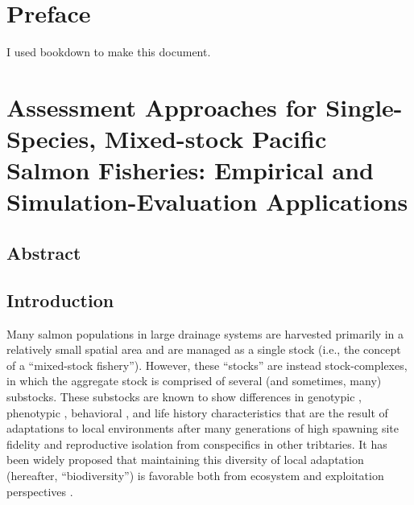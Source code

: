 \documentclass[12pt,]{book}
\theoremstyle{definition}
\theoremstyle{definition}
\theoremstyle{definition}
\theoremstyle{remark}
\begin{document}
\setlength{\parskip}{0pt plus 0pt minus 0pt}

\doublespacing

\chapter*{Preface}\label{preface}

I used bookdown \citep{xie-2015} to make this document.

\chapter{Assessment Approaches for Single-Species, Mixed-stock Pacific
Salmon Fisheries: Empirical and Simulation-Evaluation
Applications}\label{ch4}

\section*{Abstract}\label{abstract}

\newpage

\section{Introduction}\label{introduction}

\noindent
Many salmon populations in large drainage systems are harvested
primarily in a relatively small spatial area and are managed as a single
stock (i.e., the concept of a ``mixed-stock fishery''). However, these
``stocks'' are instead stock-complexes, in which the aggregate stock is
comprised of several (and sometimes, many) substocks. These substocks
are known to show differences in genotypic \citep{templin-etal-2004},
phenotypic \citep[e.g., morphology;][]{hendry-quinn-1997}, behavioral
\citep[e.g., run timing;][]{clark-etal-2015, smith-liller-2017}, and
life history \citep[i.e., age-at-maturation,][]{blair-etal-1993}
characteristics that are the result of adaptations to local environments
after many generations of high spawning site fidelity and reproductive
isolation from conspecifics in other tribtaries. It has been widely
proposed that maintaining this diversity of local adaptation (hereafter,
``biodiversity'') is favorable both from ecosystem and exploitation
perspectives \citep[i.e., the statistical dampening of random
variability in a system made up of many additive random processes,
otherwise known as the ``portfolio
effect'';][]{schindler-etal-2010, schindler-etal-2015}.
\end{document}
